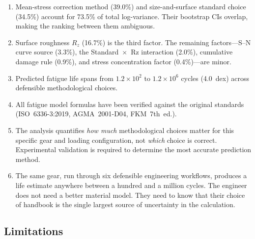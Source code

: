 \documentclass[12pt,a4paper]{article}
\begin{document}
\begin{enumerate}
  \item Mean-stress correction method (39.0\%) and size-and-surface
        standard choice (34.5\%) account for 73.5\% of total
        log-variance. Their bootstrap CIs overlap, making the ranking
        between them ambiguous.
  \item Surface roughness $R_z$ (16.7\%) is the third factor. The
        remaining factors---S--N curve source (3.3\%), the
        Standard~$\times$~Rz interaction (2.0\%), cumulative damage rule
        (0.9\%), and stress concentration factor (0.4\%)---are minor.
  \item Predicted fatigue life spans from $1.2\times10^2$ to
        $1.2\times10^6$ cycles (4.0~dex) across defensible methodological
        choices.
  \item All fatigue model formulas have been verified against the original
        standards (ISO~6336-3:2019, AGMA~2001-D04, FKM~7th~ed.).
  \item The analysis quantifies \emph{how much} methodological choices
        matter for this specific gear and loading configuration, not
        \emph{which} choice is correct. Experimental validation is
        required to determine the most accurate prediction method.
  \item The same gear, run through six defensible engineering workflows,
        produces a life estimate anywhere between a hundred and a million
        cycles. The engineer does not need a better material model. They
        need to know that their choice of handbook is the single largest
        source of uncertainty in the calculation.
\end{enumerate}

\subsection{Limitations}
\label{sec:limitations}
\end{document}
